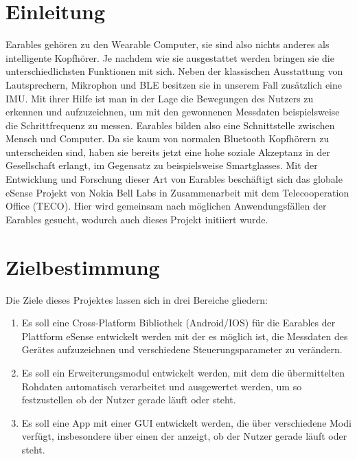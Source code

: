 \documentclass[a4paper,12pt]{article}
\title{\projektName}
\date{\today}
\begin{document}
 \setcounter{page}{2}
 \tableofcontents          %
 \clearpage

\section{Einleitung}
\Gls{Earables} gehören zu den \Gls{Wearable Computer}, sie sind also nichts anderes als intelligente Kopfhörer. Je nachdem wie sie ausgestattet werden bringen sie die unterschiedlichsten Funktionen mit sich. Neben der klassischen Ausstattung von Lautsprechern, Mikrophon und \gls{BLE} besitzen sie in unserem Fall zusätzlich eine \Gls{IMU}. Mit ihrer Hilfe ist man in der Lage die Bewegungen des Nutzers zu erkennen und aufzuzeichnen, um mit den gewonnenen Messdaten  beispielsweise die \Gls{Schrittfrequenz} zu messen.  \Gls{Earables} bilden also eine Schnittstelle zwischen Mensch und Computer. Da sie kaum von normalen Bluetooth Kopfhörern zu unterscheiden sind, haben sie bereits jetzt eine hohe soziale Akzeptanz in der Gesellschaft erlangt, im Gegensatz zu beispielsweise Smartglasses. Mit der Entwicklung und Forschung dieser Art von \Gls{Earables} beschäftigt sich das globale eSense Projekt von Nokia Bell Labs in Zusammenarbeit mit dem Telecooperation Office (TECO). Hier wird gemeinsam nach möglichen Anwendungsfällen der \Gls{Earables} gesucht, wodurch auch dieses Projekt initiiert wurde.
\section{Zielbestimmung}
Die Ziele dieses Projektes lassen sich in drei Bereiche gliedern:
\begin{enumerate}

  \item Es soll eine \Gls{Cross-Platform Bibliothek} (Android/IOS) für die \Gls{Earables} der Plattform eSense entwickelt werden mit der es möglich ist, die Messdaten des Gerätes aufzuzeichnen und verschiedene \Gls{Steuerungsparameter} zu verändern.
  
  \item Es soll ein Erweiterungsmodul entwickelt werden, mit dem die übermittelten  \Gls{Rohdaten} automatisch verarbeitet und ausgewertet werden, um so festzustellen ob der Nutzer gerade läuft oder steht.
  
  \item Es soll eine App mit einer \Gls{GUI} entwickelt werden, die über verschiedene Modi verfügt, insbesondere über einen der anzeigt, ob der Nutzer gerade läuft oder steht. 

\end{enumerate}
\end{document}
